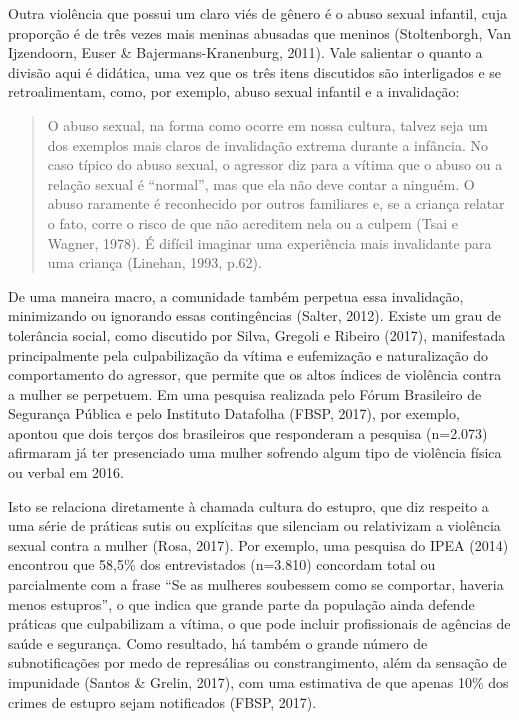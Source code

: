 Outra violência que possui um claro viés de gênero é o abuso sexual infantil, cuja proporção é de três vezes mais meninas abusadas que meninos (Stoltenborgh, Van Ijzendoorn, Euser \& Bajermans-Kranenburg, 2011). Vale salientar o quanto a divisão aqui é didática, uma vez que os três itens discutidos são interligados e se retroalimentam, como, por exemplo, abuso sexual infantil e a invalidação:

\begin{quote}
    O abuso sexual, na forma como ocorre em nossa cultura, talvez seja um dos exemplos mais claros de invalidação extrema durante a infância. No caso típico do abuso sexual, o agressor diz para a vítima que o abuso ou a relação sexual é ``normal'', mas que ela não deve contar a ninguém. O abuso raramente é reconhecido por outros familiares e, se a criança relatar o fato, corre o risco de que não acreditem nela ou a culpem (Tsai e Wagner, 1978). É difícil imaginar uma experiência mais invalidante para uma criança (Linehan, 1993, p.62).
\end{quote}

De uma maneira macro, a comunidade também perpetua essa invalidação, minimizando ou ignorando essas contingências (Salter, 2012). Existe um grau de tolerância social, como discutido por Silva, Gregoli e Ribeiro (2017), manifestada principalmente pela culpabilização da vítima e eufemização e naturalização do comportamento do agressor, que permite que os altos índices de violência contra a mulher se perpetuem. Em uma pesquisa realizada pelo Fórum Brasileiro de Segurança Pública e pelo Instituto Datafolha (FBSP, 2017), por exemplo, apontou que dois terços dos brasileiros que responderam a pesquisa (n=2.073) afirmaram já ter presenciado uma mulher sofrendo algum tipo de violência física ou verbal em 2016.

Isto se relaciona diretamente à chamada cultura do estupro, que diz respeito a uma série de práticas sutis ou explícitas que silenciam ou relativizam a violência sexual contra a mulher (Rosa, 2017). Por exemplo, uma pesquisa do IPEA (2014) encontrou que 58,5\% dos entrevistados (n=3.810) concordam total ou parcialmente com a frase ``Se as mulheres soubessem como se comportar, haveria menos estupros'', o que indica que grande parte da população ainda defende práticas que culpabilizam a vítima, o que pode incluir profissionais de agências de saúde e segurança. Como resultado, há também o grande número de subnotificações por medo de represálias ou constrangimento, além da sensação de impunidade (Santos \& Grelin, 2017), com uma estimativa de que apenas 10\% dos crimes de estupro sejam notificados (FBSP, 2017).

